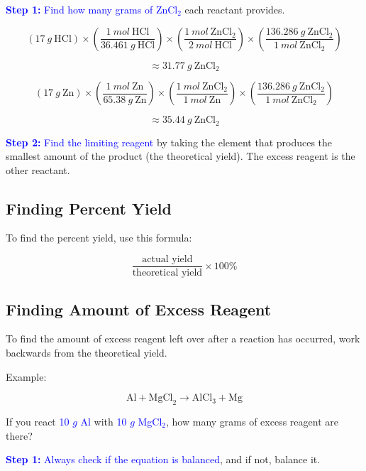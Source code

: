 \documentclass[a4paper, 12pt]{article}
\begin{document}
\textcolor{blue}{\textbf{Step 1:} Find how many grams of ZnCl$_2$} each reactant provides.

$$(17 \: g \: \text{HCl}) \times \left(\frac{1 \: mol \: \text{HCl}}{36.461 \: g \: \text{HCl}}\right) \times \left(\frac{1 \: mol \: \text{ZnCl}_2}{2 \: mol \: \text{HCl}}\right) \times \left(\frac{136.286 \: g \: \text{ZnCl}_2}{1 \: mol \: \text{ZnCl}_2}\right)$$

$$ \approx 31.77 \: g \: \text{ZnCl}_2$$

$$(17 \: g \: \text{Zn}) \times \left(\frac{1 \: mol \: \text{Zn}}{65.38 \: g \: \text{Zn}}\right) \times \left(\frac{1 \: mol \: \text{ZnCl}_2}{1 \: mol \: \text{Zn}}\right) \times \left(\frac{136.286 \: g \: \text{ZnCl}_2}{1 \: mol \: \text{ZnCl}_2}\right)$$

$$ \approx 35.44 \: g \: \text{ZnCl}_2$$

\textcolor{blue}{\textbf{Step 2:} Find the limiting reagent} by taking the element that produces the smallest amount of the product (the theoretical yield). The excess reagent is the other reactant.


\subsection{Finding Percent Yield}
To find the percent yield, use this formula:

$$\frac{\text{actual yield}}{\text{theoretical yield}} \times 100\%$$

\subsection{Finding Amount of Excess Reagent}
To find the amount of excess reagent left over after a reaction has occurred, work backwards from the theoretical yield.

Example:

$$\text{Al} + \text{MgCl}_2 \longrightarrow \text{AlCl}_3 + \text{Mg}$$

If you react \textcolor{blue}{10 $g$ Al} with \textcolor{blue}{10 $g$ MgCl$_2$}, how many grams of excess reagent are there?

\textcolor{blue}{\textbf{Step 1:} Always check if the equation is balanced}, and if not, balance it.
\end{document}
